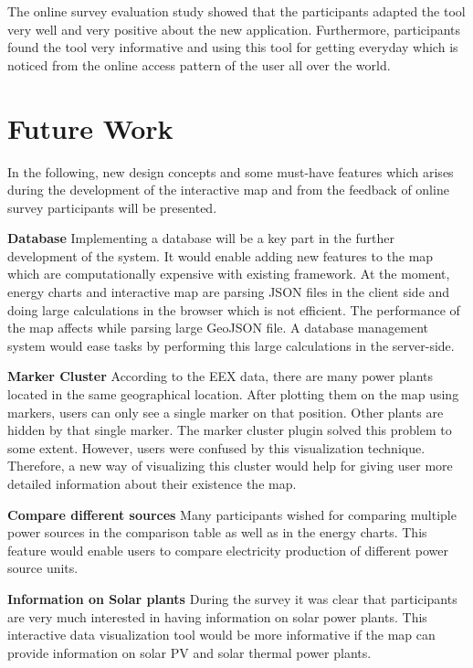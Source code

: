 The online survey evaluation study showed that the participants adapted the tool very well and very positive about the new application. Furthermore, participants found the tool very informative and using this tool for getting everyday which is noticed from the online access pattern of the user all over the world.  

\section*{Future Work}

In the following, new design concepts and some must-have features which arises during the development of the interactive map and from the feedback of online survey participants will be presented. 

\textbf{Database}
\newline
Implementing a database will be a key part in the further development of the system. It would enable adding new features to the map which are computationally expensive with existing framework. At the moment, energy charts and interactive map are parsing JSON files in the client side and doing large calculations in the browser which is not efficient. The performance of the map affects while parsing large GeoJSON file. A database management system would ease tasks by performing this large calculations in the server-side.

\textbf{Marker Cluster}
\newline
According to the EEX data, there are many power plants located in the same geographical location. After plotting them on the map using markers, users can only see a single marker on that position. Other plants are hidden by that single marker. The marker cluster plugin solved this problem to some extent. However, users were confused by this visualization technique. Therefore, a new way of visualizing this cluster would help for giving user more detailed information about their existence the map.

\textbf{Compare different sources}
\newline
Many participants wished for comparing multiple power sources in the comparison table as well as in the energy charts. This feature would enable users to compare electricity production of different power source units.

\textbf{Information on Solar plants}
\newline
During the survey it was clear that participants are very much interested in having information on solar power plants. This interactive data visualization tool would be more informative if the map can provide information on solar PV and solar thermal power plants. 

